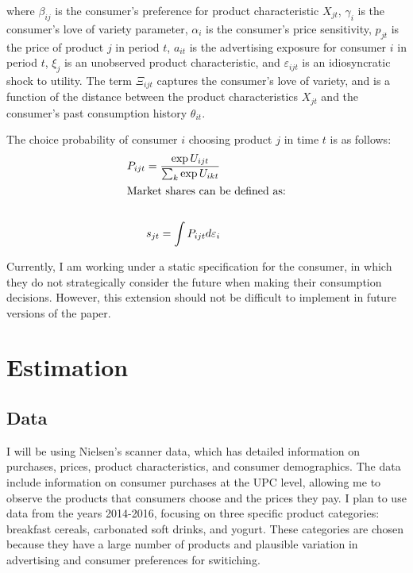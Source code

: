 \documentclass[12pt]{article}
\begin{document}
    where $\beta_{ij}$ is the consumer's preference for product characteristic $X_{jt}$, $\gamma_i$ is the consumer's love of variety parameter, $\alpha_i$ is the consumer's price sensitivity, $p_{jt}$ is the price of product $j$ in period $t$, $a_{it}$ is the advertising exposure for consumer $i$ in period $t$, $\xi_j$ is an unobserved product characteristic, and $\varepsilon_{ijt}$ is an idiosyncratic shock to utility. The term $\Xi_{ijt}$ captures the consumer's love of variety, and is a function of the distance between the product characteristics $X_{jt}$ and the consumer's past consumption history $\theta_{it}$. 

    The choice probability of consumer $i$ choosing product $j$ in time $t$ is as follows:
    \begin{alignat*}{1}
      P_{ijt} = \frac{\exp{U_{ijt}}}{\sum_k\exp{U_{ikt}}} \\
      \shortintertext{Market shares can be defined as:} \\
      s_{jt} = \int P_{ijt}d\varepsilon_i
    \end{alignat*}

    Currently, I am working under a static specification for the consumer, in which they do not strategically consider the future when making their consumption decisions. However, this extension should not be difficult to implement in future versions of the paper.

\section{Estimation}

    \subsection{Data}
    I will be using Nielsen's scanner data, which has detailed information on purchases, prices, product characteristics, and consumer demographics. The data include information on consumer purchases at the UPC level, allowing me to observe the products that consumers choose and the prices they pay. I plan to use data from the years 2014-2016, focusing on three specific product categories: breakfast cereals, carbonated soft drinks, and yogurt. These categories are chosen because they have a large number of products and plausible variation in advertising and consumer preferences for switiching.
\end{document}
